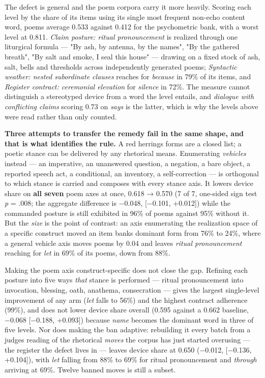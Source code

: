 \documentclass[
  10pt,
]{article}
\theoremstyle{plain}
\theoremstyle{definition}
\begin{document}
The defect is general and the poem corpora carry it more heavily.
Scoring each level by the share of its items using its single most
frequent non-echo content word, poems average 0.533 against 0.412 for
the psychometric bank, with a worst level at 0.811. \emph{Claim posture:
ritual pronouncement} is realized through one liturgical formula --- "By
ash, by antenna, by the names", "By the gathered breath", "By salt and
smoke, I seal this house" --- drawing on a fixed stock of ash, salt,
bells and thresholds across independently generated poems;
\emph{Syntactic weather: nested subordinate clauses} reaches for
\emph{because} in 79\% of its items, and \emph{Register contract:
ceremonial elevation} for \emph{silence} in 72\%. The measure cannot
distinguish a stereotyped device from a word the level entails, and
\emph{dialogue with conflicting claims} scoring 0.73 on \emph{says} is
the latter, which is why the levels above were read rather than only
counted.

\textbf{Three attempts to transfer the remedy fail in the same shape,
and that is what identifies the rule.} A red herring\textquotesingle s
forms are a closed list; a poetic stance can be delivered by any
rhetorical means. Enumerating \emph{vehicles} instead --- an imperative,
an unanswered question, a negation, a bare object, a reported speech
act, a conditional, an inventory, a self-correction --- is orthogonal to
which stance is carried and composes with every stance axis. It lowers
device share on \textbf{all seven} poem axes at once, 0.618 → 0.570 (7
of 7, one-sided sign test \emph{p} = .008; the aggregate difference is
−0.048, {[}−0.101, +0.012{]}) while the commanded posture is still
exhibited in 96\% of poems against 95\% without it. But the \emph{size}
is the point of contrast: an axis enumerating the realization space of a
specific construct moved an item bank\textquotesingle s dominant form
from 76\% to 24\%, where a general vehicle axis moves poems by 0.04 and
leaves \emph{ritual pronouncement} reaching for \emph{let} in 69\% of
its poems, down from 88\%.

Making the poem axis construct-specific does not close the gap. Refining
each posture into five ways \emph{that} stance is performed --- ritual
pronouncement into invocation, blessing, oath, anathema, consecration
--- gives the largest single-level improvement of any arm (\emph{let}
falls to 56\%) and the highest contract adherence (99\%), and does not
lower device share overall (0.595 against a 0.662 baseline, −0.068
{[}−0.188, +0.093{]}) because \emph{name} becomes the dominant word in
three of five levels. Nor does making the ban adaptive: rebuilding it
every batch from a judge\textquotesingle s reading of the rhetorical
\emph{moves} the corpus has just started overusing --- the register the
defect lives in --- leaves device share at 0.650 (−0.012, {[}−0.136,
+0.104{]}), with \emph{let} falling from 88\% to 69\% for ritual
pronouncement and \emph{through} arriving at 69\%. Twelve banned moves
is still a subset.
\end{document}

